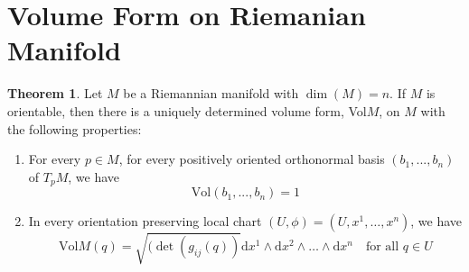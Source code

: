 \documentclass[b5paper,12pt]{article}
\newenvironment{prooff}{{\noindent\it\textcolor{black}{Proof}:}\quad}{\par}
\newcommand{\bb}[1]{\mathbb{#1}}
\newcommand{\dd}{\text{d}}
\theoremstyle{definition}
\newtheorem{theo}[defn]{Theorem}
\begin{document}
\section{Volume Form on Riemanian Manifold}
\begin{theo}
    Let $M$ be a Riemannian manifold with $\dim(M) = n$. If $M$ is orientable,
    then there is a uniquely determined volume form, Vol$M$, on $M$ with the following properties:
    \begin{enumerate}[(1)]
        \item For every $p\in M$, for every positively oriented orthonormal basis $(b_1,...,b_n)$ of $T_pM$,
              we have
              \begin{equation*}
                  \text{Vol}(b_1,...,b_n)=1
              \end{equation*}
        \item In every orientation preserving local chart $(U,\phi)=(U,x^1,\dots,x^n)$, we have
              \begin{equation*}
                  \text{Vol}M(q)=\sqrt{(\det(g_{ij}(q))}\dd x^1\wedge \dd x^2\wedge \dots \wedge \dd x^n\quad \text{for all } q\in U
              \end{equation*}
    \end{enumerate}
\end{theo}

















\end{document}

